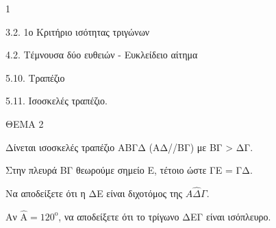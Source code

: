 \begin{ylh}{1}
    \item 3.2. 1ο Κριτήριο ισότητας τριγώνων
    \item 4.2. Τέμνουσα δύο ευθειών - Ευκλείδειο αίτημα
    \item 5.10. Τραπέζιο
    \item 5.11. Ισοσκελές τραπέζιο.
\end{ylh}

ΘΕΜΑ 2

Δίνεται ισοσκελές τραπέζιο ΑΒΓΔ (ΑΔ//ΒΓ) με ΒΓ \textgreater{} ΔΓ.

Στην πλευρά ΒΓ θεωρούμε σημείο Ε, τέτοιο ώστε ΓΕ = ΓΔ.

\begin{alist}
\item Να αποδείξετε ότι η ΔΕ είναι διχοτόμος της $A\widehat{\Delta}\Gamma$. 

\item Αν $\widehat{\text{Α}}=\text{120}^{\text{ο}}$, να αποδείξετε ότι το τρίγωνο ΔΕΓ είναι ισόπλευρο. 


\begin{center}
\end{center}
\end{alist}
